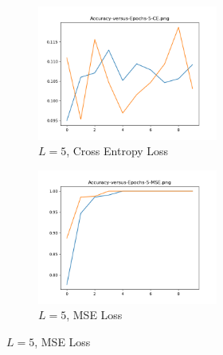 \begin{figure}[!htbp]
\begin{subfigure}
\centering
\includegraphics[angle=0,width=0.65\textwidth]{assign-3/logs/Accuracy-5-CE-hidden-5.png}
\caption{$L=5$, Cross Entropy Loss}
\end{subfigure}
\begin{subfigure}
\centering
\includegraphics[angle=0,width=0.65\textwidth]{assign-3/logs/Accuracy-5-MSE-hidden-5.png}
\caption{$L=5$, MSE Loss}
\end{subfigure}
\end{figure}

